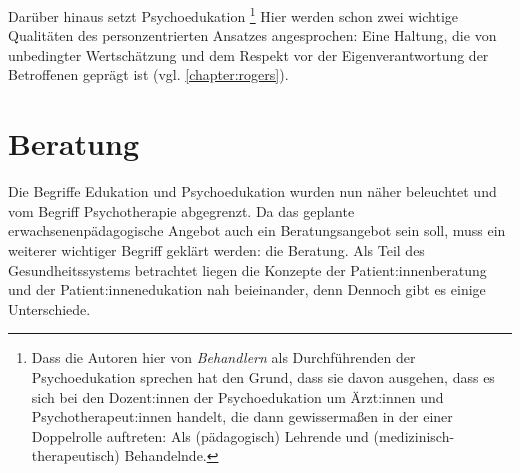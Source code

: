 \documentclass[
  twoside,
  parskip=half-,
]{scrreprt}
\begin{document}
Darüber hinaus setzt Psychoedukation \footnote{Dass die Autoren hier von \textit{Behandlern} als Durchführenden der Psychoedukation sprechen hat den Grund, dass sie davon ausgehen, dass es sich bei den Dozent:innen der Psychoedukation um Ärzt:innen und Psychotherapeut:innen handelt, die dann gewissermaßen in der einer Doppelrolle auftreten: Als (pädagogisch) Lehrende und (medizinisch-therapeutisch) Behandelnde.} Hier werden schon zwei wichtige Qualitäten des personzentrierten Ansatzes angesprochen: Eine Haltung, die von unbedingter Wertschätzung und dem Respekt vor der Eigenverantwortung der Betroffenen geprägt ist (vgl. \autoref{chapter:rogers}).

\section{Beratung}

Die Begriffe Edukation und Psychoedukation wurden nun näher beleuchtet und vom Begriff Psychotherapie abgegrenzt. Da das geplante erwachsenenpädagogische Angebot auch ein Beratungsangebot sein soll, muss ein weiterer wichtiger Begriff geklärt werden: die Beratung. Als Teil des Gesundheitssystems betrachtet liegen die Konzepte der Patient:innenberatung und der Patient:innenedukation nah beieinander, denn  Dennoch gibt es einige Unterschiede.
\end{document}
